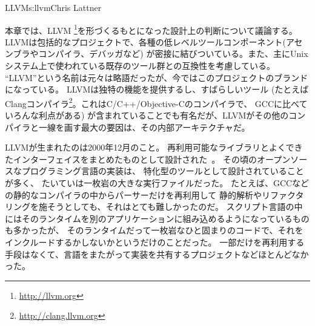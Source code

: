 \begin{aosachapter}{LLVM}{s:llvm}{Chris Lattner}

本章では、LLVM
\footnote{\url{http://llvm.org}}を形づくるもとになった設計上の判断について議論する。
LLVMは包括的なプロジェクトで、各種の低レベルツールコンポーネント(アセンブラやコンパイラ、デバッガなど)
が密接に結びついている。また、主にUnixシステム上で使われている既存のツール群との互換性を考慮している。
``LLVM''という名前は元々は略語だったが、今ではこのプロジェクトのブランドになっている。
LLVMは独特の機能を提供するし、すばらしいツール
(たとえばClangコンパイラ\footnote{\url{http://clang.llvm.org}}。これはC/C++/Objective-Cのコンパイラで、
GCCに比べていろんな利点がある)
が含まれていることでも有名だが、LLVMがその他のコンパイラと一線を画す最大の要因は、その内部アーキテクチャだ。

LLVMが生まれたのは2000年12月のこと。
再利用可能なライブラリとよくできたインターフェイスをまとめたものとして設計された~\cite{bib:lattner:cgo}。
その頃のオープンソースなプログラミング言語の実装は、
特化型のツールとして設計されていることが多く、
たいていは一枚岩の大きな実行ファイルだった。
たとえば、GCCなどの静的なコンパイラの中からパーサーだけを再利用して
静的解析やリファクタリングを施そうとしても、それはとても難しかったのだ。
スクリプト言語の中にはそのランタイムを別のアプリケーションに組み込めるようになっているものも多かったが、
そのランタイムだって一枚岩なひと固まりのコードで、それをインクルードするかしないかというだけのことだった。
一部だけを再利用する手段はなくて、言語をまたがって実装を共有するプロジェクトなどほとんどなかった。


\end{aosachapter}
